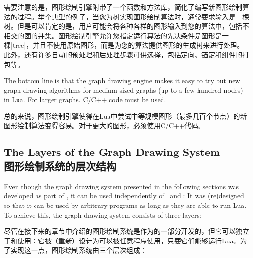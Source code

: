 
需要注意的是，图形绘制引擎附带了一个函数和方法库，简化了编写新图形绘制算法的过程。举个典型的例子，当您为树实现图形绘制算法时，通常要求输入是一棵树。但是可以肯定的是，用户可能会将各种各样的图形输入到您的算法中，包括不相交的团的并集。图形绘制引擎允许您指定运行算法的先决条件是图形是一棵|tree|，并且不使用原始图形，而是为您的算法提供图形的生成树来进行处理。此外，还有许多自动的预处理和后处理步骤可供选择，包括定向、锚定和组件的打包等。



The bottom line is that the graph drawing engine makes it easy
to try out new graph drawing algorithms for medium sized graphs (up
to a few hundred nodes) in Lua. For larger graphs, C/C++ code must be
used.

总的来说，图形绘制引擎使得在Lua中尝试中等规模图形（最多几百个节点）的新图形绘制算法变得容易。对于更大的图形，必须使用C/C++代码。


\subsection{The Layers of the Graph Drawing System\\图形绘制系统的层次结构}
\label{section-gd-layers}

Even though the graph drawing system presented in the following sections was
developed as part of \pgfname, it can be used independently of \pgfname\ and
\tikzname: It was (re)designed so that it can be used by arbitrary programs as
long as they are able to run Lua. To achieve this, the graph drawing system
consists of three layers:

尽管在接下来的章节中介绍的图形绘制系统是作为\pgfname 的一部分开发的，但它可以独立于\pgfname 和\tikzname 使用：它被（重新）设计为可以被任意程序使用，只要它们能够运行Lua。为了实现这一点，图形绘制系统由三个层次组成：


